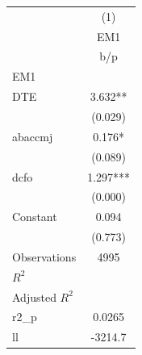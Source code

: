 {
\def\sym#1{\ifmmode^{#1}\else\(^{#1}\)\fi}
\begin{tabular}{l*{1}{c}}
\hline\hline
                    &\multicolumn{1}{c}{(1)}\\
                    &\multicolumn{1}{c}{EM1}\\
                    &         b/p   \\
\hline
EM1                 &               \\
DTE                 &       3.632** \\
                    &     (0.029)   \\
abaccmj             &       0.176*  \\
                    &     (0.089)   \\
dcfo                &       1.297***\\
                    &     (0.000)   \\
Constant            &       0.094   \\
                    &     (0.773)   \\
\hline
Observations        &        4995   \\
\(R^{2}\)           &               \\
Adjusted \(R^{2}\)  &               \\
r2\_p                &      0.0265   \\
ll                  &     -3214.7   \\
\hline\hline
\end{tabular}
}
